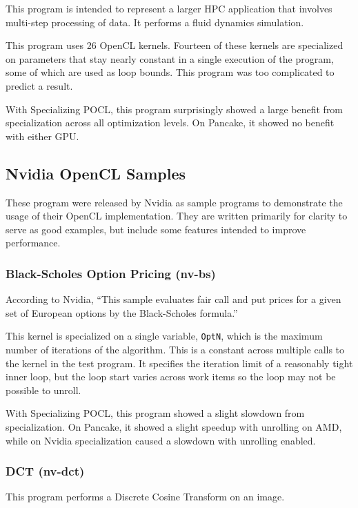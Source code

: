 \documentclass{acm_proc_article-sp}
\begin{document}
This program is intended to represent a larger HPC application that involves
multi-step processing of data. It performs a fluid dynamics simulation.

This program uses 26 OpenCL kernels. Fourteen of these kernels are specialized
on parameters that stay nearly constant in a single execution of the program,
some of which are used as loop bounds. This program was too complicated to
predict a result.

With Specializing POCL, this program surprisingly showed a large benefit from
specialization across all optimization levels. On Pancake, it showed no benefit
with either GPU.

\subsection{Nvidia OpenCL Samples}

These program were released by Nvidia as sample programs to demonstrate the
usage of their OpenCL implementation. They are written primarily for clarity to
serve as good examples, but include some features intended to improve
performance.

\subsubsection{Black-Scholes Option Pricing (nv-bs)}

According to Nvidia, ``This sample evaluates fair call and put prices for a
given set of European options by the Black-Scholes formula.'' 

This kernel is specialized on a single variable, {\tt OptN}, which is the maximum
number of iterations of the algorithm. This is a constant across multiple calls
to the kernel in the test program. It specifies the iteration limit of a
reasonably tight inner loop, but the loop start varies across work items so the
loop may not be possible to unroll.

With Specializing POCL, this program showed a slight slowdown from
specialization. On Pancake, it showed a slight speedup with unrolling on AMD,
while on Nvidia specialization caused a slowdown with unrolling enabled.

\subsubsection{DCT (nv-dct)}

This program performs a Discrete Cosine Transform on an image.
\end{document}
